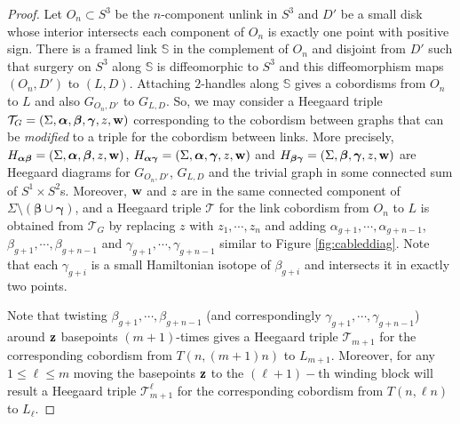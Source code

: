 \documentclass{amsart}
\newcommand{\alphas}{\boldsymbol{\alpha}}
\newcommand{\betas}{\boldsymbol{\beta}}
\newcommand{\gammas}{\boldsymbol{\gamma}}
\newcommand{\w}{\mathbf{w}}
\newcommand{\x}{\mathbf{x}}
\def\w{{\bf{w}}}
\def\z{{\bf{z}}}
\def\x{\mathbf{x}}
\begin{document}
\begin{proof}
Let  $O_n\subset S^3$ be the $n$-component unlink in $S^3$ and $D'$ be a small disk whose interior intersects each component of $O_n$ is exactly one point with positive sign. There is a framed link $\mathbb{S}$ in the complement of $O_n$ and disjoint from $D'$ such that surgery on $S^3$ along $\mathbb{S}$ is diffeomorphic to $S^3$ and this diffeomorphism maps $(O_n,D')$ to $(L,D)$. Attaching $2$-handles along $\mathbb{S}$ gives a cobordisms from $O_n$ to $L$ and also $G_{O_n,D'}$ to $G_{L,D}$. So, we may consider a Heegaard triple $\mathcal{T}_G=(\Sigma,\alphas,\betas,\gammas,z,\w)$ corresponding to the cobordism between graphs that can be \emph{modified} to a triple for the cobordism between links. More precisely,  $H_{\alphas\betas}=(\Sigma,\alphas,\betas,z,\w)$, $H_{\alphas\gammas}=(\Sigma,\alphas,\gammas,z,\w)$ and $H_{\betas\gammas}=(\Sigma,\betas,\gammas,z,\w)$ are Heegaard diagrams for $G_{O_n,D'}$, $G_{L,D}$ and the trivial graph in some connected sum of $S^1\times S^2$s. Moreover, $\w$ and $z$ are in the same connected component of $\Sigma\setminus(\betas\cup\gammas)$, and a Heegaard triple $\mathcal{T}$ for the link cobordism from $O_n$ to $L$ is obtained from $\mathcal{T}_G$ by replacing $z$ with $z_1,\cdots,z_n$ and adding $\alpha_{g+1},\cdots,\alpha_{g+n-1}$, $\beta_{g+1},\cdots,\beta_{g+n-1}$ and $\gamma_{g+1},\cdots,\gamma_{g+n-1}$ similar to Figure \ref{fig:cableddiag}. Note that each $\gamma_{g+i}$ is a small Hamiltonian isotope of $\beta_{g+i}$ and intersects it in exactly two points. 

Note that twisting $\beta_{g+1},\cdots,\beta_{g+n-1}$ (and correspondingly $\gamma_{g+1},\cdots,\gamma_{g+n-1}$) around $\z$ basepoints $(m+1)$-times gives a Heegaard triple $\mathcal{T}_{m+1}$ for the corresponding cobordism from $T(n,(m+1)n)$ to $L_{m+1}$. Moreover, for any $1\le \ell\le m$ moving the basepoints $\z$ to the $(\ell+1)-$th winding block will result a Heegaard triple $\mathcal{T}_{m+1}^{\ell}$ for the corresponding cobordism from $T(n,\ell n)$ to $L_{\ell}$. 
















\end{proof}
\end{document}
